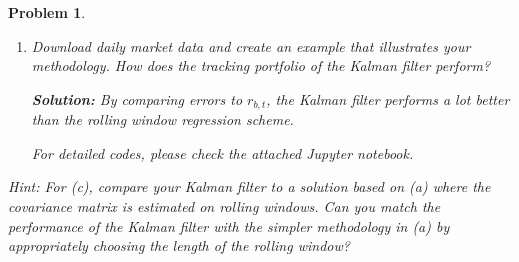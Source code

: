 \documentclass[11pt]{article}
\theoremstyle{plain} %
\newtheorem{problem}[theorem]{Problem}
\newenvironment{solution}
{\color{C2}\normalfont\begin{framed}\begingroup\textbf{Solution:} }
  {\endgroup\end{framed}}
\theoremstyle{remark}
\begin{document}
\begin{problem}
\begin{enumerate}[label=(\alph*)]
\begin{solution}
          \textbf{Initial State:}

          Naturally, we set the initial state variable
          $\mathbf{x}_0  \sim \mathcal{N}\left(\boldsymbol{\mu}_{0}, \mathbf{P}_{0}\right)$
          where $\boldsymbol{\mu}_{0} = (1, \ldots, 1)\in \mathbb{R}^{50}$ and $\mathbf{P}_{0} = \mathbf{I}_{50} * 0.1$.

          Therefore, by our construction, we have the linear state space model:
          \begin{align*}
            \begin{aligned}
               & \mathbf{x}_{t}=\mathbf{F}_{t} \mathbf{x}_{t-1}+\mathbf{w}_{t} \\
               & \mathbf{y}_{t}=\mathbf{H}_{t} \mathbf{x}_{t}+\mathbf{v}_{t}
            \end{aligned}\quad \text{ where } \quad
            \mathbf{x}_{0} \sim \mathcal{N}\left(\boldsymbol{\mu}_{0}, \mathbf{P}_{0}\right),\quad
            \mathbf{w}_{t} \sim \mathcal{N}\left(\mathbf{0}, \mathbf{Q}_{t}\right), \quad
            \mathbf{v}_{t} \sim \mathcal{N}\left(\mathbf{0}, \mathbf{R}_{t}\right)
          \end{align*}
          Additionally, the initial state $\mathbf{x}_{0}$ and the noise terms $\mathbf{w}_{t},
            \mathbf{v}_{t}$ are all assumed to be mutually independent.
        \end{solution}
  \item Download daily market data and create an example that illustrates your
        methodology. How does the tracking portfolio of the Kalman filter perform?

        \begin{solution}
          By comparing errors to $r_{b, t}$, the Kalman filter performs a lot better than the rolling window regression scheme.

          For detailed codes, please check the attached Jupyter notebook.
        \end{solution}
\end{enumerate}
Hint: For (c), compare your Kalman filter to a solution based on (a) where the
covariance matrix is estimated on rolling windows. Can you match the performance
of the Kalman filter with the simpler methodology in (a) by appropriately
choosing the length of the rolling window?
\end{problem}
\end{document}

